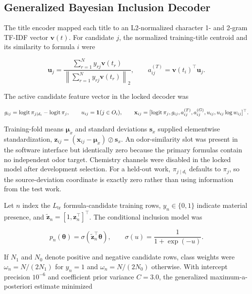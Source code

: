 \documentclass[11pt]{article}
\begin{document}
\subsection{Generalized Bayesian Inclusion Decoder}

The title encoder mapped each title to an L2-normalized character 1- and 2-gram TF-IDF vector \(\mathbf v(t)\). For candidate \(j\), the normalized training-title centroid and its similarity to formula \(i\) were

\begin{equation}
\label{eq:title-affinity}
\mathbf u_j=\frac{\sum_{r=1}^{N}y_{rj}\mathbf v(t_r)}{\left\|\sum_{r=1}^{N}y_{rj}\mathbf v(t_r)\right\|_2},\qquad a^{(T)}_{ij}=\mathbf v(t_i)^{\top}\mathbf u_j.
\end{equation}

The active candidate feature vector in the locked decoder was

\begin{equation}
\label{eq:candidate-features}
g_{ij}=\operatorname{logit}\pi_{j\mid d_i}-\operatorname{logit}\pi_j,\qquad u_{ij}={\bf1}(j\in O_i),\qquad \mathbf x_{ij}=[\operatorname{logit}\pi_j,g_{ij},a^{(T)}_{ij},a^{(G)}_{ij},u_{ij},u_{ij}\log w_{ij}]^{\top}.
\end{equation}

Training-fold means \(\boldsymbol\mu_x\) and standard deviations \(\mathbf s_x\) supplied elementwise standardization, \(\mathbf z_{ij}=(\mathbf x_{ij}-\boldsymbol\mu_x)\oslash\mathbf s_x\). An odor-similarity slot was present in the software interface but identically zero because the primary formulas contain no independent odor target. Chemistry channels were disabled in the locked model after development selection. For a held-out work, \(\pi_{j\mid d_i}\) defaults to \(\pi_j\), so the source-deviation coordinate is exactly zero rather than using information from the test work.

Let \(n\) index the \(L_{\mathrm{tr}}\) formula-candidate training rows, \(y_n\in\{0,1\}\) indicate material presence, and \(\widetilde{\mathbf z}_n=[1,\mathbf z_n^{\top}]^{\top}\). The conditional inclusion model was

\begin{equation}
\label{eq:logistic-model}
p_n(\boldsymbol\theta)=\sigma(\widetilde{\mathbf z}_n^{\top}\boldsymbol\theta),\qquad \sigma(u)=\frac{1}{1+\exp(-u)}.
\end{equation}

If \(N_1\) and \(N_0\) denote positive and negative candidate rows, class weights were \(\omega_n=N/(2N_1)\) for \(y_n=1\) and \(\omega_n=N/(2N_0)\) otherwise. With intercept precision \(10^{-6}\) and coefficient prior variance \(C=3.0\), the generalized maximum-a-posteriori estimate minimized
\end{document}
